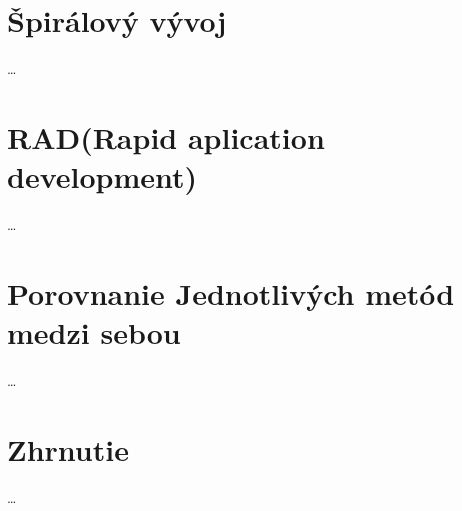 \documentclass[10pt,oneside,slovak,a4paper]{article}
\begin{document}
\section{Špirálový vývoj}\label{spiral}
\ldots
\section{ RAD(Rapid aplication development)}\label{RAD}
\ldots
\section{Porovnanie Jednotlivých metód medzi sebou}\label{porovnávanie}
\ldots
\section{Zhrnutie}\label{zaver}
\ldots


\end{document}
